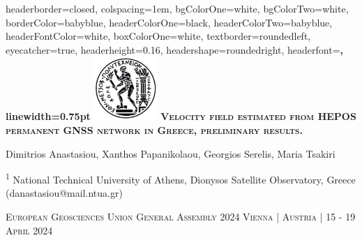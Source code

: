 \documentclass[landscape,a0paper,fontscale=0.346]{baposter} %
\begin{document}
\begin{poster}
{
headerborder=closed, %
colspacing=1em, %
bgColorOne=white, %
bgColorTwo=white, %
borderColor=babyblue, %
headerColorOne=black, %
headerColorTwo=babyblue, %
headerFontColor=white, %
boxColorOne=white, %
textborder=roundedleft, %
eyecatcher=true, %
headerheight=0.16\textheight, %
headershape=roundedright, %
headerfont=\Large\bf\textsc, %
linewidth=0.75pt %
}
%
{\includegraphics[height=6.5em]{../../logos/ntua.png}} %
{\bf\textsc{Velocity field estimated from HEPOS permanent GNSS network in Greece, preliminary results.}\vspace{0.3em} } %
{\large Dimitrios Anastasiou, Xanthos Papanikolaou, Georgios Serelis, Maria Tsakiri 
{\small \par{\textsuperscript{1} National Technical University of Athens, Dionysos Satellite Observatory, Greece (danastasiou@mail.ntua.gr)} 
} \vspace{0.3em}
\par{\textsc{European Geosciences Union General Assembly 2024 Vienna | Austria | 15 - 19 April 2024}} 
\vskip 0.2cm

}
\end{poster}
\end{document}
